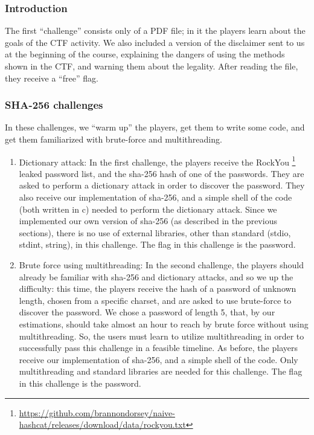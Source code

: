 \documentclass[sigconf]{acmart}
\begin{document}
\subsubsection{Introduction}

The first “challenge” consists only of a PDF file; in it the players learn about the goals of the CTF activity. We also included a version of the disclaimer sent to us at the beginning of the course, explaining the dangers of using the methods shown in the CTF, and warning them about the legality. After reading the file, they receive a “free” flag.

\subsubsection{SHA-256 challenges}
In these challenges, we “warm up” the players, get them to write some code, and get them familiarized with brute-force and multithreading.

\begin{enumerate}
\item Dictionary attack:
  In the first challenge, the players receive the RockYou \footnote{\hyperlink{https://github.com/brannondorsey/naive-hashcat/releases/download/data/rockyou.txt}{https://github.com/brannondorsey/naive-hashcat/releases/download/data/rockyou.txt}} leaked password list, and the sha-256 hash of one of the passwords. They are asked to perform a dictionary attack in order to discover the password.  
  They also receive our implementation of sha-256, and a simple shell of the code (both written in c) needed to perform the dictionary attack. Since we implemented our own version of sha-256 (as described in the previous sections), there is no use of external libraries, other than standard (stdio, stdint, string), in this challenge. 
  The flag in this challenge is the password.
  
\item Brute force using multithreading:
  In the second challenge, the players should already be familiar with sha-256 and dictionary attacks, and so we up the difficulty: this time, the players receive the hash of a password of unknown length, chosen from a specific charset, and are asked to use brute-force to discover the password.
  We chose a password of length 5, that, by our estimations, should take almost an hour to reach by brute force without using multithreading. So, the users must learn to utilize multithreading in order to successfully pass this challenge in a feasible timeline.
  As before, the players receive our implementation of sha-256, and a simple shell of the code. Only multithreading and standard libraries are needed for this challenge.
  The flag in this challenge is the password.
\end{enumerate}
\end{document}
